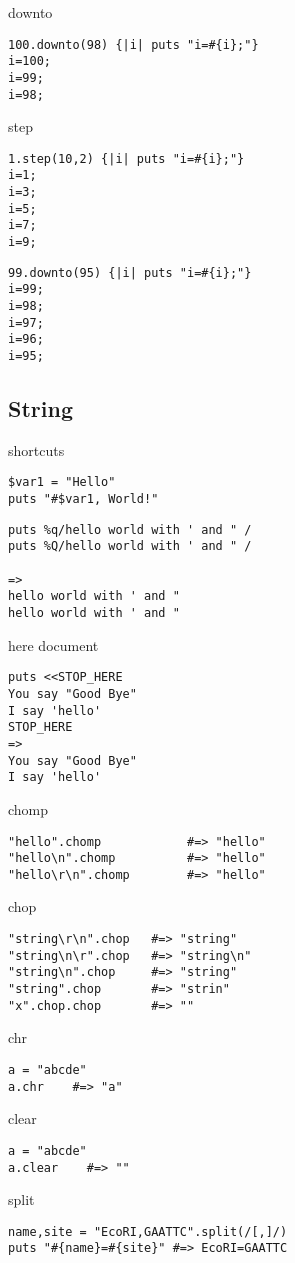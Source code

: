 \documentclass{article}
\begin{document}
downto
\begin{lstlisting}
100.downto(98) {|i| puts "i=#{i};"}
i=100;
i=99;
i=98;
\end{lstlisting}

step
\begin{lstlisting}
1.step(10,2) {|i| puts "i=#{i};"}
i=1;
i=3;
i=5;
i=7;
i=9;
\end{lstlisting}

\begin{lstlisting}
99.downto(95) {|i| puts "i=#{i};"}
i=99;
i=98;
i=97;
i=96;
i=95;
\end{lstlisting}



\subsection{String}
shortcuts
\begin{lstlisting}
$var1 = "Hello"
puts "#$var1, World!"
\end{lstlisting}

\begin{lstlisting}
puts %q/hello world with ' and " /
puts %Q/hello world with ' and " /

=>
hello world with ' and " 
hello world with ' and " 
\end{lstlisting}

here document
\begin{lstlisting}
puts <<STOP_HERE
You say "Good Bye"
I say 'hello'
STOP_HERE
=>
You say "Good Bye"
I say 'hello'
\end{lstlisting}

chomp
\begin{lstlisting}
"hello".chomp            #=> "hello"
"hello\n".chomp          #=> "hello"
"hello\r\n".chomp        #=> "hello"
\end{lstlisting}
chop
\begin{lstlisting}
"string\r\n".chop   #=> "string"
"string\n\r".chop   #=> "string\n"
"string\n".chop     #=> "string"
"string".chop       #=> "strin"
"x".chop.chop       #=> ""
\end{lstlisting}
chr
\begin{lstlisting}
a = "abcde"
a.chr    #=> "a"
\end{lstlisting}
clear
\begin{lstlisting}
a = "abcde"
a.clear    #=> ""
\end{lstlisting}
split
\begin{lstlisting}
name,site = "EcoRI,GAATTC".split(/[,]/)
puts "#{name}=#{site}" #=> EcoRI=GAATTC
\end{lstlisting}
\end{document}
